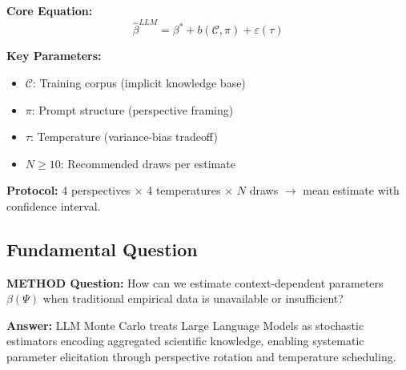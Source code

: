 
\begin{tcolorbox}[colback=yellow!10!white, colframe=orange!75!black,
    title=\textbf{Quick Reference}]

\textbf{Core Equation:}
\begin{equation}
\hat{\beta}^{LLM} = \beta^* + b(\mathcal{C}, \pi) + \varepsilon(\tau)
\tag{AN-Core}
\end{equation}

\textbf{Key Parameters:}
\begin{itemize}[nosep]
    \item $\mathcal{C}$: Training corpus (implicit knowledge base)
    \item $\pi$: Prompt structure (perspective framing)
    \item $\tau$: Temperature (variance-bias tradeoff)
    \item $N \geq 10$: Recommended draws per estimate
\end{itemize}

\textbf{Protocol:} 4 perspectives $\times$ 4 temperatures $\times$ $N$ draws
$\to$ mean estimate with confidence interval.

\end{tcolorbox}


\subsection{Fundamental Question}

\begin{tcolorbox}[colback=purple!5!white, colframe=purple!75!black]
\textbf{METHOD Question:} How can we estimate context-dependent parameters
$\beta(\Psi)$ when traditional empirical data is unavailable or insufficient?

\textbf{Answer:} LLM Monte Carlo treats Large Language Models as stochastic
estimators encoding aggregated scientific knowledge, enabling systematic
parameter elicitation through perspective rotation and temperature scheduling.
\end{tcolorbox}


